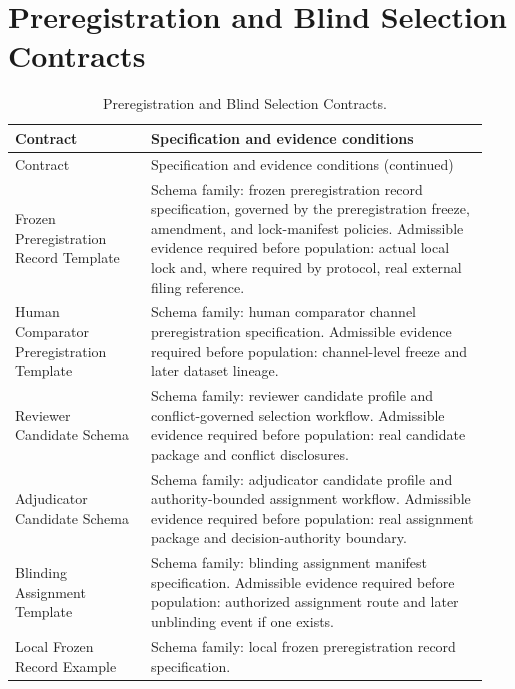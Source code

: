 \documentclass[11pt,a4paper]{article}
\begin{document}
\section{Preregistration and Blind Selection Contracts}\label{app:selection-contracts}
\begingroup\small
\setlength{\tabcolsep}{5pt}
\begin{longtable}{@{}>{\raggedright\arraybackslash}p{0.27\linewidth}p{0.67\linewidth}@{}}
\caption{Preregistration and Blind Selection Contracts.}\\
\toprule Contract & Specification and evidence conditions \\ \midrule
\endfirsthead
\toprule Contract & Specification and evidence conditions (continued) \\ \midrule
\endhead
Frozen Preregistration Record Template & Schema family: frozen preregistration record specification, governed by the
preregistration freeze, amendment, and lock-manifest policies.\newline 
Admissible evidence required before population: actual local lock and, where
required by protocol, real external filing reference. \\ \addlinespace
Human Comparator Preregistration Template & Schema family: human comparator channel preregistration specification.\newline 
Admissible evidence required before population: channel-level freeze and later
dataset lineage. \\ \addlinespace
Reviewer Candidate Schema & Schema family: reviewer candidate profile and conflict-governed selection workflow.\newline 
Admissible evidence required before population: real candidate package and
conflict disclosures. \\ \addlinespace
Adjudicator Candidate Schema & Schema family: adjudicator candidate profile and authority-bounded assignment workflow.\newline 
Admissible evidence required before population: real assignment package and
decision-authority boundary. \\ \addlinespace
Blinding Assignment Template & Schema family: blinding assignment manifest specification.\newline 
Admissible evidence required before population: authorized assignment route and
later unblinding event if one exists. \\ \addlinespace
Local Frozen Record Example & Schema family: local frozen preregistration record specification.\newline 

\end{longtable}
\end{document}
